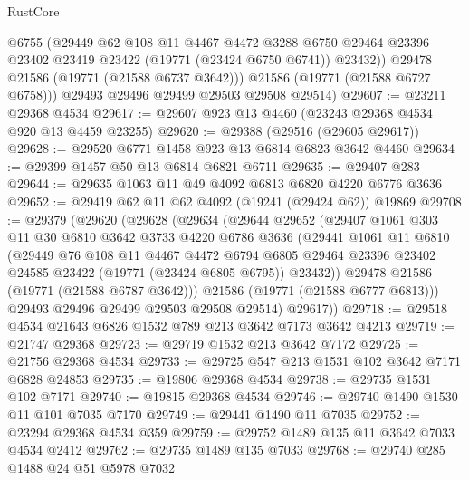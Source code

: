\begin{lexlean}{RustCore}
\begin{coremodule}
            @6755
            (@29449
              @62
              @108
              @11
              @4467
              @4472
              @3288
              @6750
              @29464
              @23396
              @23402
              @23419
              @23422
              (@19771 (@23424 @6750 @6741))
              @23432))
          @29478
          @21586
          (@19771 (@21588 @6737 @3642)))
        @21586
        (@19771 (@21588 @6727 @6758)))
      @29493
      @29496
      @29499
      @29503
      @29508
      @29514)
@29607 := @23211 @29368 @4534
@29617 := @29607 @923 @13 @4460 (@23243 @29368 @4534 @920 @13 @4459 @23255)
@29620 := @29388 (@29516 (@29605 @29617))
@29628 := @29520 @6771 @1458 @923 @13 @6814 @6823 @3642 @4460
@29634 := @29399 @1457 @50 @13 @6814 @6821 @6711
@29635 := @29407 @283
@29644 := @29635 @1063 @11 @49 @4092 @6813 @6820 @4220 @6776 @3636
@29652 := @29419 @62 @11 @62 @4092 (@19241 (@29424 @62)) @19869
@29708 := @29379
    (@29620
      (@29628
        (@29634
          (@29644
            @29652
            (@29407
              @1061
              @303
              @11
              @30
              @6810
              @3642
              @3733
              @4220
              @6786
              @3636
              (@29441
                @1061
                @11
                @6810
                (@29449
                  @76
                  @108
                  @11
                  @4467
                  @4472
                  @6794
                  @6805
                  @29464
                  @23396
                  @23402
                  @24585
                  @23422
                  (@19771 (@23424 @6805 @6795))
                  @23432))
              @29478
              @21586
              (@19771 (@21588 @6787 @3642)))
            @21586
            (@19771 (@21588 @6777 @6813)))
          @29493
          @29496
          @29499
          @29503
          @29508
          @29514)
        @29617))
@29718 := @29518 @4534 @21643 @6826 @1532 @789 @213 @3642 @7173 @3642 @4213
@29719 := @21747 @29368
@29723 := @29719 @1532 @213 @3642 @7172
@29725 := @21756 @29368 @4534
@29733 := @29725 @547 @213 @1531 @102 @3642 @7171 @6828 @24853
@29735 := @19806 @29368 @4534
@29738 := @29735 @1531 @102 @7171
@29740 := @19815 @29368 @4534
@29746 := @29740 @1490 @1530 @11 @101 @7035 @7170
@29749 := @29441 @1490 @11 @7035
@29752 := @23294 @29368 @4534 @359
@29759 := @29752 @1489 @135 @11 @3642 @7033 @4534 @2412
@29762 := @29735 @1489 @135 @7033
@29768 := @29740 @285 @1488 @24 @51 @5978 @7032

\end{coremodule}
\end{lexlean}

